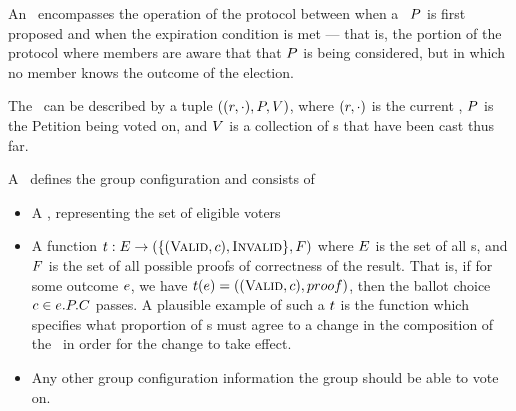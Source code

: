  An \StructElection~encompasses the operation of the protocol between
  when a \KwPetition~$P$ is first proposed and when the expiration
  condition is met --- that is, the portion of the protocol where members are
  aware that that $P$ is being considered, but in which no member
  knows the outcome of the election.

  The \StructElectionState~can be described by a tuple $((r, \cdot),
  P, V)$, where $(r, \cdot)$ is the current \StructState,
  $P$ is the Petition being voted on, and $V$ is a
  collection of \StructBallot s that have been cast thus far.

  A \KwManifest~defines the group configuration and consists of
  \begin{itemize}
    \item A \KwRoster, representing the set of eligible voters
    \item A function $t : E \to (\{(\textsc{Valid}, c), \textsc{Invalid}\}, F)$
      where $E$ is the set of all \StructElectionState s, and
      $F$ is the set of all possible proofs of correctness of the result.
      That is, if for some outcome $e$, we
      have $t(e) = ((\textsc{Valid}, c), proof)$, then
      the ballot choice $c \in e.P.C$
      passes.  A plausible example of such a $t$ is the function which
      specifies what proportion of \KwPeer s must agree to a change in the
      composition of the \KwRoster~in order for the change to take effect.
    \item Any other group configuration information the group should be able to
      vote on.
  \end{itemize}

